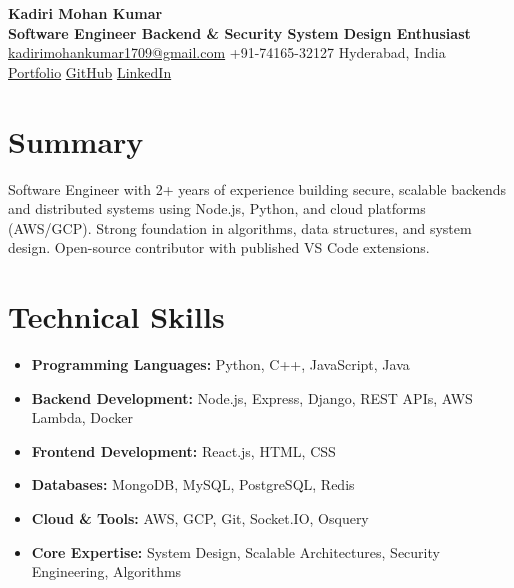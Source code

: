 \documentclass[a4paper,10pt]{article}
\newcommand{\resumeItem}[1]{\item\small{#1}}
\begin{document}
\begin{center}
  {\LARGE\bfseries Kadiri Mohan Kumar}\\
  \vspace{3pt}
  \small
  \textbf{Software Engineer \textbar{} Backend \& Security \textbar{} System Design Enthusiast}\\
  \href{mailto:kadirimohankumar1709@gmail.com}{kadirimohankumar1709@gmail.com} \textbar{} +91-74165-32127 \textbar{} Hyderabad, India\\
  \href{https://mohankumarkadiri.vercel.app}{Portfolio} \textbar{} \href{https://github.com/mohankumarkadiri}{GitHub} \textbar{} \href{https://www.linkedin.com/in/mohankumarkadiri/}{LinkedIn}
\end{center}

\section*{Summary}
Software Engineer with 2+ years of experience building secure, scalable backends and distributed systems using Node.js, Python, and cloud platforms (AWS/GCP). Strong foundation in algorithms, data structures, and system design. Open-source contributor with published VS Code extensions.

\section*{Technical Skills}
\begin{itemize}[leftmargin=*,itemsep=2pt]
  \resumeItem{\textbf{Programming Languages:} Python, C++, JavaScript, Java}
  \resumeItem{\textbf{Backend Development:} Node.js, Express, Django, REST APIs, AWS Lambda, Docker}
  \resumeItem{\textbf{Frontend Development:} React.js, HTML, CSS}
  \resumeItem{\textbf{Databases:} MongoDB, MySQL, PostgreSQL, Redis}
  \resumeItem{\textbf{Cloud \& Tools:} AWS, GCP, Git, Socket.IO, Osquery}
  \resumeItem{\textbf{Core Expertise:} System Design, Scalable Architectures, Security Engineering, Algorithms}
\end{itemize}

\end{document}
